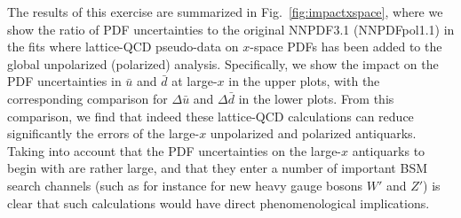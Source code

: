 The results of this exercise are summarized
in Fig.~\ref{fig:impactxspace}, where we show the
ratio of PDF uncertainties to the original
  NNPDF3.1 (NNPDFpol1.1) in the fits where lattice-QCD pseudo-data
  on $x$-space PDFs has been added to the global unpolarized
  (polarized) analysis.
  Specifically, we show the impact on the PDF uncertainties
  in $\bar{u}$ and $\bar{d}$ at large-$x$ in the upper
  plots, with the corresponding comparison for $\Delta\bar{u}$
  and $\Delta\bar{d}$ in the lower plots.
  From this comparison, we find that
  indeed these lattice-QCD calculations can reduce significantly
  the errors of the large-$x$ unpolarized and polarized
  antiquarks.
  Taking into account that the PDF uncertainties on the large-$x$
  antiquarks to begin with are rather large, and that they
  enter a number of important BSM search channels
  (such as for instance for new heavy gauge bosons $W'$ and $Z'$)
  is clear that such calculations would have direct
  phenomenological implications.

